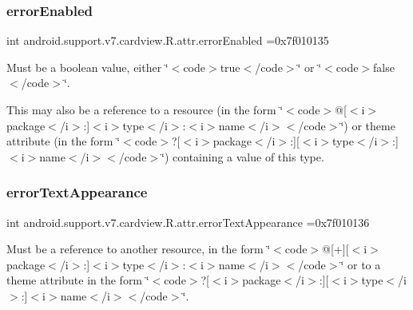 \subsubsection{\texorpdfstring{error\+Enabled}{errorEnabled}}
{\footnotesize\ttfamily int android.\+support.\+v7.\+cardview.\+R.\+attr.\+error\+Enabled =0x7f010135\hspace{0.3cm}{\ttfamily [static]}}

Must be a boolean value, either \char`\"{}$<$code$>$true$<$/code$>$\char`\"{} or \char`\"{}$<$code$>$false$<$/code$>$\char`\"{}. 

This may also be a reference to a resource (in the form \char`\"{}$<$code$>$@\mbox{[}$<$i$>$package$<$/i$>$\+:\mbox{]}$<$i$>$type$<$/i$>$\+:$<$i$>$name$<$/i$>$$<$/code$>$\char`\"{}) or theme attribute (in the form \char`\"{}$<$code$>$?\mbox{[}$<$i$>$package$<$/i$>$\+:\mbox{]}\mbox{[}$<$i$>$type$<$/i$>$\+:\mbox{]}$<$i$>$name$<$/i$>$$<$/code$>$\char`\"{}) containing a value of this type. \mbox{\label{classandroid_1_1support_1_1v7_1_1cardview_1_1R_1_1attr_aa24f76b658731325f150e64ac38b5ce6}} 
\subsubsection{\texorpdfstring{error\+Text\+Appearance}{errorTextAppearance}}
{\footnotesize\ttfamily int android.\+support.\+v7.\+cardview.\+R.\+attr.\+error\+Text\+Appearance =0x7f010136\hspace{0.3cm}{\ttfamily [static]}}

Must be a reference to another resource, in the form \char`\"{}$<$code$>$@\mbox{[}+\mbox{]}\mbox{[}$<$i$>$package$<$/i$>$\+:\mbox{]}$<$i$>$type$<$/i$>$\+:$<$i$>$name$<$/i$>$$<$/code$>$\char`\"{} or to a theme attribute in the form \char`\"{}$<$code$>$?\mbox{[}$<$i$>$package$<$/i$>$\+:\mbox{]}\mbox{[}$<$i$>$type$<$/i$>$\+:\mbox{]}$<$i$>$name$<$/i$>$$<$/code$>$\char`\"{}. \mbox{\label{classandroid_1_1support_1_1v7_1_1cardview_1_1R_1_1attr_a8f85e7e29323492d9ca305428b27de38}} 
